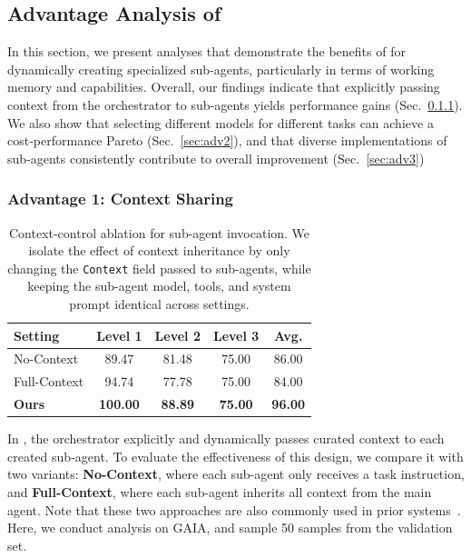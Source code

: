 \subsection{Advantage Analysis of \our}
\label{subsec:adv}

In this section, we present analyses that demonstrate the benefits of \our for dynamically creating specialized sub‑agents, particularly in terms of working memory and capabilities. Overall, our findings indicate that explicitly passing context from the orchestrator to sub‑agents yields performance gains (Sec.~\ref{sec:adv1}). We also show that selecting different models for different tasks can achieve a cost‑performance Pareto (Sec.~\ref{sec:adv2}), and that diverse implementations of sub‑agents consistently contribute to overall improvement (Sec.~\ref{sec:adv3})

\subsubsection{Advantage 1: Context Sharing}
\label{sec:adv1}

\begin{table}[t]
\centering
\small
\setlength{\tabcolsep}{6pt}
\renewcommand{\arraystretch}{1.15}
\caption{Context-control ablation for sub-agent invocation. We isolate the effect of context inheritance by only changing the \texttt{Context} field passed to sub-agents, while keeping the sub-agent model, tools, and system prompt identical across settings.}
\label{tab:context_control}
\begin{tabular}{l c c c c}
\toprule
\textbf{Setting} & \textbf{Level 1} & \textbf{Level 2} & \textbf{Level 3} & \textbf{Avg. } \\
\midrule
No-Context    & 89.47 & 81.48 & 75.00 & 86.00 \\
Full-Context  & 94.74 & 77.78 & 75.00 & 84.00 \\
\textbf{Ours} & \textbf{100.00} & \textbf{88.89} & \textbf{75.00} & \textbf{96.00} \\
\bottomrule
\end{tabular}
\end{table}


In \our{}, the orchestrator explicitly and dynamically passes curated context to each created sub‑agent. To evaluate the effectiveness of this design, we compare it with two variants: \textbf{No-Context}, where each sub-agent only receives a task instruction, and \textbf{Full-Context}, where each sub-agent inherits all context from the main agent. Note that these two approaches are also commonly used in prior systems~\cite{sun2025scaling, anthropic_claude_code_subagents}. 
Here, we conduct analysis on GAIA, and sample 50 samples from the validation set.

